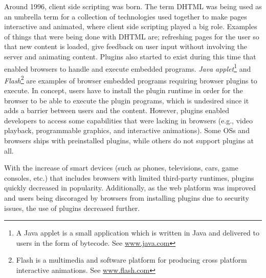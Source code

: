 \documentclass[a4paper,11pt]{kth-mag}
\begin{document}
        Around 1996, client side scripting was born.
        The term \gls{DHTML} was being used as an umbrella term for a collection of technologies used together to make pages interactive and animated, where client side scripting played a big role.
        Examples of things that were being done with \gls{DHTML} are; refreshing pages for the user so that new content is loaded, give feedback on user input without involving the server and animating content.
        Plugins also started to exist during this time that enabled \glspl{browser} to handle and execute embedded programs.
        \emph{Java applet}\footnote{A Java applet is a small application which is written in Java and delivered to users in the form of bytecode. See \url{www.java.com}} and \emph{Flash}\footnote{Flash is a multimedia and software platform for producing cross platform interactive animations. See \url{www.flash.com}} are examples of browser embedded programs requiring browser plugins to execute.
        In concept, users have to install the plugin runtime in order for the browser to be able to execute the plugin programs, which is undesired since it adds a barrier between users and the content.
        However, plugins enabled developers to access some capabilities that were lacking in browsers (e.g., video playback, programmable graphics, and interactive animations).
        Some \glspl{OS} and \glspl{browser} ships with preinstalled plugins, while others do not support plugins at all.

        With the increase of smart devices (such as phones, televisions, cars, game consoles, etc.) that includes \glspl{browser} with limited \gls{third-party} runtimes, plugins quickly decreased in popularity.
        Additionally, as the web platform was improved and users being discoraged by browsers from installing plugins due to security issues, the use of plugins decreased further.
\end{document}
